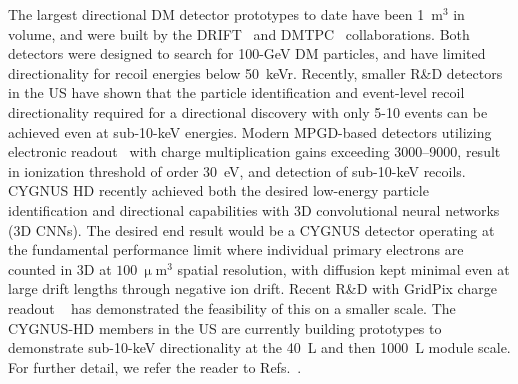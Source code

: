 The largest directional DM detector prototypes to date have been 1~m$^3$ in volume, and were built by the DRIFT~\cite{Battat:2016xxe} and DMTPC~\cite{Ahlen:2010ub} collaborations. Both detectors were designed to search for 100-GeV DM particles, and have limited directionality for recoil energies below 50~keVr.  Recently, smaller R\&D detectors in the US have shown that the particle identification and event-level recoil directionality required for a directional discovery with only 5-10 events can be achieved even at sub-10-keV energies. Modern MPGD-based detectors utilizing electronic readout~\cite{Jaegle:2019jpx} with charge multiplication gains exceeding 3000--9000, result in ionization threshold of order 30~eV, and detection of sub-10-keV recoils. CYGNUS HD recently achieved both the desired low-energy particle identification and directional capabilities with 3D convolutional neural networks (3D CNNs). The desired end result would be a CYGNUS detector operating at the fundamental performance limit where individual primary electrons are counted in 3D at $100~\upmu$m$^3$ spatial resolution, with diffusion kept minimal even at large drift lengths through negative ion drift. Recent R\&D with GridPix charge readout ~\cite{Ligtenberg:2021viw} has demonstrated the feasibility of this on a smaller scale. The CYGNUS-HD members in the US are currently building prototypes to demonstrate sub-10-keV directionality at the 40~L and then 1000~L module scale.  For further detail, we refer the reader to Refs.~\cite{Vahsen:2021gnb,Vahsen:2020pzb,SnowmassIF53}.